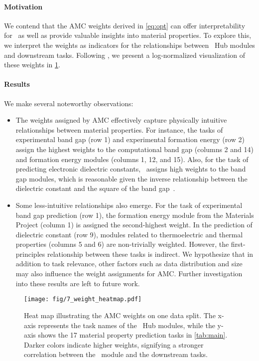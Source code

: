 \paragraph{Motivation}
We contend that the AMC weights derived in \cref{eq:opt} can offer interpretability for \name \ as well as provide valuable insights into material properties. To explore this, we interpret the weights as indicators for the relationships between \name \ Hub modules and downstream tasks.
Following \citet{chang2022towards}, we present a log-normalized visualization of these weights in \cref{fig:heatmap}.

\paragraph{Results}
We make several noteworthy observations:
\begin{itemize}[leftmargin=*]
    \item The weights assigned by AMC effectively capture physically intuitive relationships between material properties. For instance, the tasks of experimental band gap (row 1) and experimental formation energy (row 2) assign the highest weights to the computational band gap (columns 2 and 14) and formation energy modules (columns 1, 12, and 15). Also, for the task of predicting electronic dielectric constants, \name \ assigns high weights to the band gap modules, which is reasonable given the inverse relationship between the dielectric constant and the square of the band gap~\cite{ravichandran2016solid}.
    \item Some less-intuitive relationships also emerge. For the task of experimental band gap prediction (row 1), the formation energy module from the Materials Project (column 1) is assigned the second-highest weight. In the prediction of dielectric constant (row 9), modules related to thermoelectric and thermal properties (columns 5 and 6) are non-trivially weighted. However, the first-principles relationship between these tasks is indirect. We hypothesize that in addition to task relevance, other factors such as data distribution and size may also influence the weight assignments for AMC. Further investigation into these results are left to future work.
\end{itemize}

\begin{figure}[!th]
    \centering
    \texttt{[image: fig/7\_weight\_heatmap.pdf]}
    \caption{Heat map illustrating the AMC weights on one data split. The x-axis represents the task names of the \name \ Hub modules, while the y-axis shows the 17 material property prediction tasks in \cref{tab:main}. Darker colors indicate higher weights, signifying a stronger correlation between the \name \ module and the downstream tasks.}
    \label{fig:heatmap}
\end{figure}